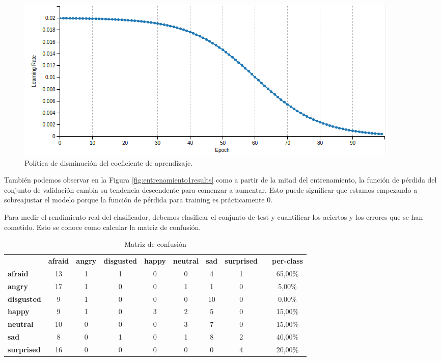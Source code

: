 \documentclass[a4paper,11pt]{book}
\begin{document}
\begin{figure}[h]
	\centering
	\includegraphics[width=0.9\linewidth]{imagenes/entrenamiento1results1}
	\caption[Resultados del entrenamiento 1]{Política de disminución del coeficiente de aprendizaje.}
	\label{fig:entrenamiento1results1}
\end{figure}

También podemos observar en la Figura \ref{fig:entrenamiento1results} como a partir de la mitad del entrenamiento, la función de pérdida del conjunto de validación cambia su tendencia descendente para comenzar a aumentar. Esto puede significar que estamos empezando a sobreajustar el modelo porque la función de pérdida para training es prácticamente 0.



Para medir el rendimiento real del clasificador, debemos clasificar el conjunto de test y cuantificar los aciertos y los errores que se han cometido. Esto se conoce como calcular la matriz de confusión.

\begin{table}[h]
	\centering
	\small
	\setlength\tabcolsep{3pt}
	\setlength\extrarowheight{2pt}
	\begin{tabular}{lccccccclc}
		& \multicolumn{1}{l}{\textbf{afraid}} & \multicolumn{1}{l}{\textbf{angry}} & \multicolumn{1}{l}{\textbf{disgusted}} & \multicolumn{1}{l}{\textbf{happy}} & \multicolumn{1}{l}{\textbf{neutral}} & \multicolumn{1}{l}{\textbf{sad}} & \multicolumn{1}{l}{\textbf{surprised}} &  & \multicolumn{1}{l}{\textbf{per-class}} \\
		\textbf{afraid}    & \cellcolor[HTML]{EFEFEF}13 & 1	& 1 & 0 & 0 & 4 & 1 &  & 65,00\% \\
		\textbf{angry}     & 17 & \cellcolor[HTML]{EFEFEF}1 & 0 & 0 & 1 & 1 & 0 &  & 5,00\% \\
		\textbf{disgusted} & 9 & 1 & \cellcolor[HTML]{EFEFEF}0 & 0 & 0 & 10 & 0 &  & 0,00\% \\
		\textbf{happy}     & 9 & 1 & 0 & \cellcolor[HTML]{EFEFEF}3 & 2 & 5 & 0 &  & 15,00\% \\
		\textbf{neutral}   & 10 & 0 & 0 & 0 & \cellcolor[HTML]{EFEFEF}3 & 7 & 0 &  & 15,00\% \\
		\textbf{sad}       & 8 & 0 & 1 & 0 & 1 & \cellcolor[HTML]{EFEFEF}8 & 2 &  & 40,00\% \\
		\textbf{surprised} & 16 & 0 & 0 & 0 & 0 & 0 & \cellcolor[HTML]{EFEFEF}4 &  & 20,00\%
	\end{tabular}
	\caption{Matriz de confusión}
	\label{tab:entrenamiento1MC}
\end{table}
\end{document}
